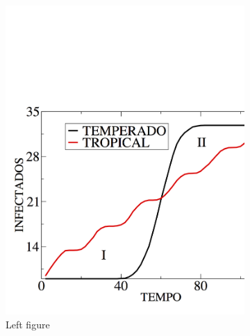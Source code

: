 \documentclass[10pt,twoside,a4paper]{article}
\begin{document}
\begin{figure}[!ht]
\centering
\begin{subfigure}{0.49\textwidth}
\centering
\includegraphics[scale=0.2]{cnmac3}
\caption{Left figure}
\label{fig:left}
\end{subfigure}
\begin{subfigure}{0.49\textwidth}
\centering

\end{subfigure}
\end{figure}
\end{document}
